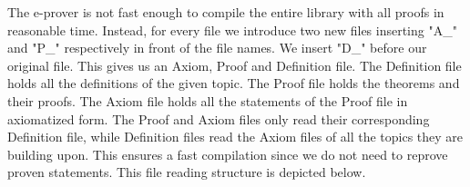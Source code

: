 \documentclass[11pt]{article}
\begin{document}
\begin{figure}[h]
\begin{center}
\end{center}
\end{figure}

\newpage

The e-prover is not fast enough to compile the entire library with all proofs in reasonable time. 
Instead, for every file we introduce two new files inserting "A\_" and "P\_" respectively in front of the file names. We insert "D\_" before our original file. This gives us an Axiom, Proof and Definition file. 
The Definition file holds all the definitions of the given topic. 
The Proof file holds the theorems and their proofs. The Axiom file holds all the statements of the Proof file in axiomatized form. 
The Proof and Axiom files only read their corresponding Definition file, while Definition files read the Axiom files of all the topics they are building upon. 
This ensures a fast compilation since we do not need to reprove proven statements. 
This file reading structure is depicted below.
\end{document}
